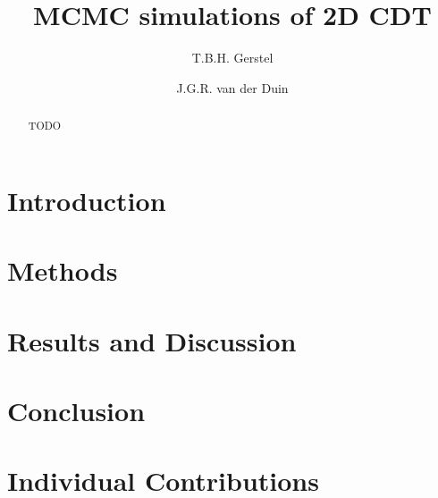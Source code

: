 \documentclass{article}
\title{MCMC simulations of 2D CDT}
\author{T.B.H. Gerstel \and J.G.R. van der Duin}
\begin{document}
\maketitle

\begin{abstract} %
    TODO
\end{abstract}

\newpage

\section{Introduction}


\section{Methods}


\section{Results and Discussion}


\section{Conclusion}


\printbibliography

\appendix
\section{Individual Contributions}
\end{document}
